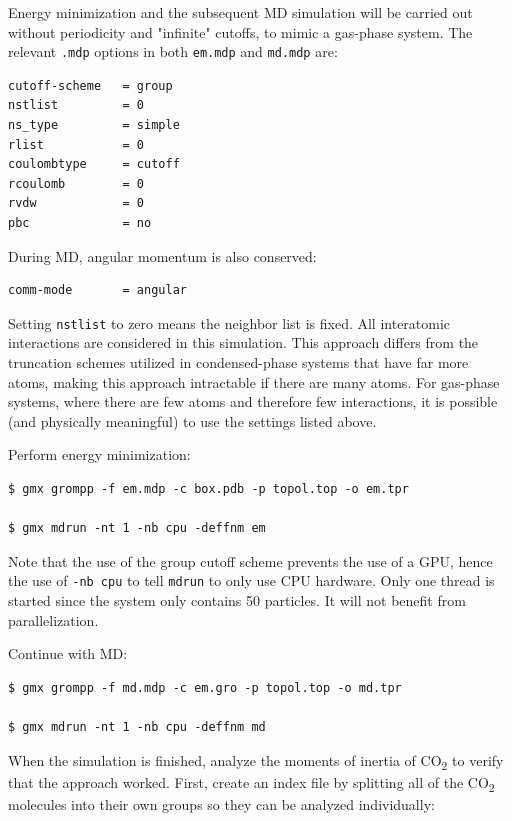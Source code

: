 \documentclass[9pt,tutorial,pubversion]{livecoms}
\begin{document}
Energy minimization and the subsequent MD simulation will be carried out without periodicity and "infinite" cutoffs, to mimic a gas-phase system. The relevant \texttt{.mdp} options in both \texttt{em.mdp} and \texttt{md.mdp} are:

\begin{lstlisting}
cutoff-scheme   = group
nstlist         = 0
ns_type         = simple
rlist           = 0
coulombtype     = cutoff
rcoulomb        = 0
rvdw            = 0
pbc             = no
\end{lstlisting}

During MD, angular momentum is also conserved:

\begin{lstlisting}
comm-mode       = angular
\end{lstlisting}

Setting \texttt{nstlist} to zero means the neighbor list is fixed. All interatomic interactions are considered in this simulation. This approach differs from the truncation schemes utilized in condensed-phase systems that have far more atoms, making this approach intractable if there are many atoms. For gas-phase systems, where there are few atoms and therefore few interactions, it is possible (and physically meaningful) to use the settings listed above.

Perform energy minimization:

\begin{lstlisting}
$ gmx grompp -f em.mdp -c box.pdb -p topol.top -o em.tpr

$ gmx mdrun -nt 1 -nb cpu -deffnm em
\end{lstlisting}

Note that the use of the group cutoff scheme prevents the use of a GPU, hence the use of \texttt{-nb cpu} to tell \texttt{mdrun} to only use CPU hardware. Only one thread is started since the system only contains 50 particles. It will not benefit from parallelization.

Continue with MD:

\begin{lstlisting}
$ gmx grompp -f md.mdp -c em.gro -p topol.top -o md.tpr

$ gmx mdrun -nt 1 -nb cpu -deffnm md
\end{lstlisting}

When the simulation is finished, analyze the moments of inertia of CO\textsubscript{2} to verify that the approach worked. First, create an index file by splitting all of the CO\textsubscript{2} molecules into their own groups so they can be analyzed individually:
\end{document}
